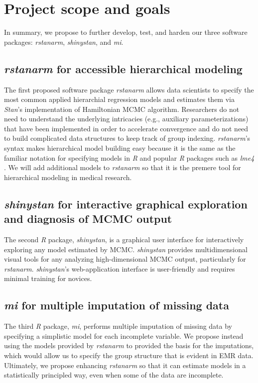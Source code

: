 \documentclass[11pt,notitlepage]{article}
\begin{document}
\section*{Project scope and goals}

In summary, we propose to further develop, test, and harden our three software packages: \textit{rstanarm}, \textit{shinystan}, and \textit{mi}.

\subsection*{\textit{rstanarm} for accessible hierarchical modeling}
The first proposed software package \textit{rstanarm} allows data scientists to specify the most common applied hierarchial regression models 
and estimates them via \textit{Stan}'s implementation of Hamiltonian MCMC algorithm. Researchers do not
need to understand the underlying intricacies (e.g., auxiliary parameterizations) that have been implemented in order to accelerate convergence and 
do not need to build complicated data structures to keep track of group indexing. \textit{rstanarm}'s syntax makes hierarchical model building easy
because it is the same as the familiar notation for specifying models in \textit{R} and popular \textit{R} packages such as \textit{lme4} \cite{lme4}.
We will add additional models to \textit{rstanarm} so that it is the premere tool for hierarchical modeling in medical research.

\subsection*{\textit{shinystan} for interactive graphical exploration and diagnosis of MCMC output}  
The second \textit{R} package, \textit{shinystan}, is a graphical user interface for interactively exploring any model estimated by MCMC. 
\textit{shinystan} provides multidimensional visual tools for any analyzing high-dimensional MCMC output, particularly for 
\textit{rstanarm}. \textit{shinystan}'s web-application interface is user-friendly and requires minimal training for novices.

\subsection*{\textit{mi} for multiple imputation of missing data}
The third \textit{R} package, \textit{mi}, performs multiple imputation of missing data by specifying a simplistic model 
for each incomplete variable. We propose instead using the models provided by \textit{rstanarm} to provided the basis for
the imputations, which would allow us to specify the group structure that is evident in EMR data. Ultimately, we 
propose enhancing \textit{rstanarm} so that it can estimate models in a statistically principled way, even when some of
the data are incomplete.
\end{document}
